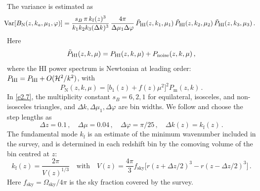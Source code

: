The variance is estimated as 
\begin{equation}
\!\!\!{\mathrm{Var} [{B_{\mathrm N}}(z, k_a,\mu_{1},\varphi)]}
=\frac{s_B\,\pi\, k_{\mathrm f}(z)^3}{k_1k_2k_3 (\Delta k)^3}\,\frac{{4\pi}}{ \Delta \mu_1 \Delta \varphi} \,
\tilde{P}_{{\mathrm{HI}}}(z,k_{1},\mu_{1})\,\tilde{P}_{{\mathrm{HI}}}(z,k_{2},\mu_{2}) \,\tilde{P}_{{\mathrm{HI}}}(z,k_{3},\mu_{3})\,.
\label{e2.7}
\end{equation}
Here
\begin{equation}
\tilde{P}_{{\mathrm{HI}}}(z, k, \mu) = P_{{\mathrm{HI}}}(z, k, \mu) + P_\mathrm{noise}(z,k,\mu)\,, \label{e2.4}
\end{equation}
where the HI power spectrum is Newtonian at leading order: $P_{{\mathrm{HI}}}= P_{{\mathrm{HI}}} +O(\mathcal{H}^2/k^2)$, with
\begin{equation}
P_{\mathrm N}(z, k, \mu) = \big[b_{1}(z)+f(z)\mu^{2}\big]^{2}P_{\mathrm m}(z,k)\,.\label{e2.5_1}
\end{equation}
In \eqref{e2.7}, the multiplicity constant $s_B=6, 2, 1$ for equilateral, isosceles, and non-isosceles triangles,  and $\Delta k,\Delta \mu_1,  \Delta \varphi$ are bin widths. We follow \citep{Karagiannis:2018jdt,Maartens:2019yhx} and choose the step lengths as
\begin{equation}
\Delta z = 0.1\,, \quad \Delta \mu = 0.04\,, \quad {\Delta\varphi=\pi/25}\,, \quad \Delta k(z) = k_{\mathrm{f}}(z)\,.\label{e4.1} 
\end{equation} 
The fundamental mode $k_{\mathrm{f}}$ is an estimate of  the minimum wavenumber included in the survey, and is determined in each redshift bin  by the comoving volume of the bin centred at $z$:
\begin{equation}
k_{\mathrm{f}}(z) = \frac{2\pi}{V(z)^{1/3}} \quad \mbox{with} \quad V(z) = \frac{4\pi}{3}f_{\mathrm{sky}} \big[r(z+{\Delta z}/{2})^{3} - r(z-{\Delta z}/{2})^{3} \big] \,.\label{e2.8}
\end{equation}
Here $f_{\mathrm{sky}}=\Omega_\mathrm{sky}/4\pi$ is the sky fraction covered by the survey.
%
%
%
%
